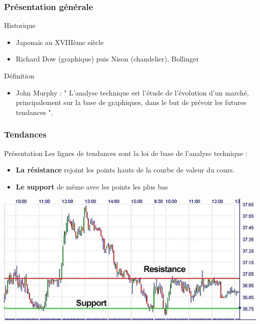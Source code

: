 \begin{frame}
    \frametitle{Présentation générale}
  	\begin{block}{Historique}
  	\begin{itemize}
  		\item Japonais au XVIIIème siècle
  		\item Richard Dow (graphique) puis Nison (chandelier), Bollinger
	\end{itemize}
	
	\end{block}
	\pause
	\begin{block}{Définition}
		\begin{itemize}
			\item John Murphy : " L’analyse technique est l’étude de l’évolution d’un marché, principalement sur la base de graphiques, dans le but de prévoir les futures tendances ".
		\end{itemize}
	\end{block}
\end{frame}

\begin{frame}
    \frametitle{Tendances}
  	\begin{block}{Présentation}
  		Les lignes de tendances sont la loi de base de l’analyse technique :
  		\begin{itemize}
  			\item \textbf{La résistance} rejoint les points hauts de la courbe de valeur du cours.
  			\item \textbf{Le support} de même avec les points les plus bas
  		\end{itemize}
  		\center
  	\includegraphics[scale=0.3]{images/supportresistance.jpg}

	\end{block}
\end{frame}

